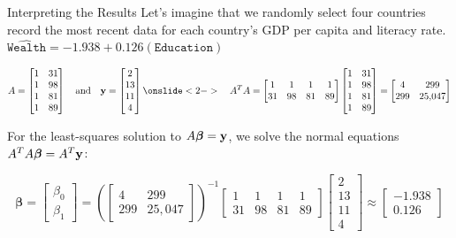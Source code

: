 \documentclass[xcolor=dvipsnames,aspectratio=169,t]{beamer}
\begin{document}
\begin{frame}{Interpreting the Results}
  Let's imagine that we randomly select four countries record the most recent data for each country's GDP per capita and literacy rate. \alert{$ \widehat{\texttt{Wealth}} = -1.938 + 0.126( \texttt{Education})$} 

  \[ A= \begin{bmatrix} 1 & 31 \\ 1 & 98 \\ 1 & 81 \\ 1 & 89 \end{bmatrix}  \quad \mbox{and} \quad \mathbf{y} =\begin{bmatrix} 2 \\ 13 \\ 11 \\ 4 \end{bmatrix} 
  \onslide<2->{
  \quad A^T A = \begin{bmatrix} 1 & 1 & 1 & 1 \\ 31 & 98 & 81 & 89 \end{bmatrix}  \begin{bmatrix} 1 & 31 \\ 1 & 98 \\ 1 & 81 \\ 1 & 89 \end{bmatrix} = \begin{bmatrix}4 & 299 \\ 299 & 25,\!047 \end{bmatrix}} \]

  \pause
  For the least-squares solution to $A \boldsymbol\beta = \mathbf{y}$,
  we solve the normal equations $A^T A \boldsymbol\beta = A^T \mathbf{y}$:

  \[ \boldsymbol\beta = \begin{bmatrix} \beta_0 \\ \beta_1 \end{bmatrix}  = \left( \begin{bmatrix}4 & 299 \\ 299 & 25,\!047 \end{bmatrix} \right)^{-1}  \begin{bmatrix} 1 & 1 & 1 & 1 \\ 31 & 98 & 81 & 89 \end{bmatrix} \begin{bmatrix} 2 \\ 13 \\ 11 \\ 4 \end{bmatrix} \approx \begin{bmatrix} -1.938 \\ 0.126 \end{bmatrix} \]
\end{frame}
\end{document}
